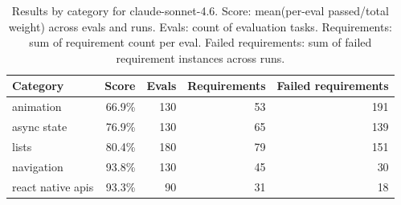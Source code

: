 \begin{table}[htbp]
\centering
\begin{tabular}{lrrrr}
\toprule
Category & Score & Evals & Requirements & Failed requirements \\
\midrule
animation & 66.9\% & 130 & 53 & 191 \\
async state & 76.9\% & 130 & 65 & 139 \\
lists & 80.4\% & 180 & 79 & 151 \\
navigation & 93.8\% & 130 & 45 & 30 \\
react native apis & 93.3\% & 90 & 31 & 18 \\
\bottomrule
\end{tabular}
\caption{Results by category for claude-sonnet-4.6. Score: mean(per-eval passed/total weight) across evals and runs. Evals: count of evaluation tasks. Requirements: sum of requirement count per eval. Failed requirements: sum of failed requirement instances across runs.}
\end{table}
